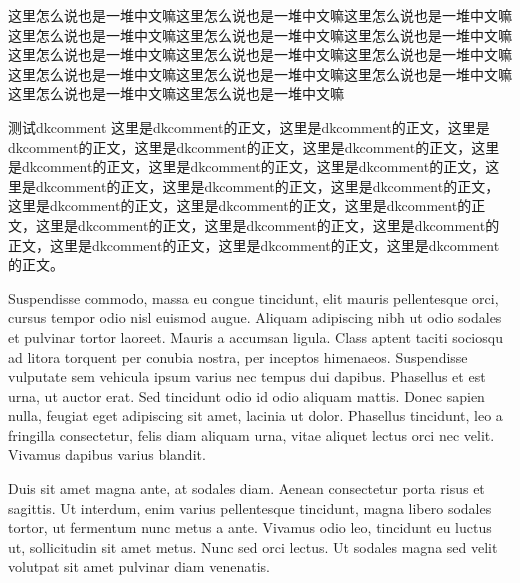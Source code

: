 \makelettertitle

\begin{cvletter}

这里怎么说也是一堆中文嘛这里怎么说也是一堆中文嘛这里怎么说也是一堆中文嘛这里怎么说也是一堆中文嘛这里怎么说也是一堆中文嘛这里怎么说也是一堆中文嘛这里怎么说也是一堆中文嘛这里怎么说也是一堆中文嘛这里怎么说也是一堆中文嘛这里怎么说也是一堆中文嘛这里怎么说也是一堆中文嘛这里怎么说也是一堆中文嘛这里怎么说也是一堆中文嘛这里怎么说也是一堆中文嘛

\begin{dkcomment}{测试dkcomment}{\faTree}
这里是dkcomment的正文，这里是dkcomment的正文，这里是dkcomment的正文，这里是dkcomment的正文，这里是dkcomment的正文，这里是dkcomment的正文，这里是dkcomment的正文，这里是dkcomment的正文，这里是dkcomment的正文，这里是dkcomment的正文，这里是dkcomment的正文，这里是dkcomment的正文，这里是dkcomment的正文，这里是dkcomment的正文，这里是dkcomment的正文，这里是dkcomment的正文，这里是dkcomment的正文，这里是dkcomment的正文，这里是dkcomment的正文，这里是dkcomment的正文。
\end{dkcomment}

Suspendisse commodo, massa eu congue tincidunt, elit mauris pellentesque orci, cursus tempor odio nisl euismod augue. Aliquam adipiscing nibh ut odio sodales et pulvinar tortor laoreet. Mauris a accumsan ligula. Class aptent taciti sociosqu ad litora torquent per conubia nostra, per inceptos himenaeos. Suspendisse vulputate sem vehicula ipsum varius nec tempus dui dapibus. Phasellus et est urna, ut auctor erat. Sed tincidunt odio id odio aliquam mattis. Donec sapien nulla, feugiat eget adipiscing sit amet, lacinia ut dolor. Phasellus tincidunt, leo a fringilla consectetur, felis diam aliquam urna, vitae aliquet lectus orci nec velit. Vivamus dapibus varius blandit.

Duis sit amet magna ante, at sodales diam. Aenean consectetur porta risus et sagittis. Ut interdum, enim varius pellentesque tincidunt, magna libero sodales tortor, ut fermentum nunc metus a ante. Vivamus odio leo, tincidunt eu luctus ut, sollicitudin sit amet metus. Nunc sed orci lectus. Ut sodales magna sed velit volutpat sit amet pulvinar diam venenatis.

\end{cvletter}


\makeletterclosing
